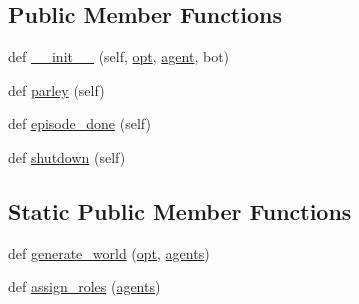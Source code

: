 \subsection*{Public Member Functions}
\begin{DoxyCompactItemize}
\item 
def \hyperlink{classparlai_1_1chat__service_1_1tasks_1_1chatbot_1_1worlds_1_1MessengerBotChatTaskWorld_a5e7d694f09fe64607a3e0c8b19e5e893}{\+\_\+\+\_\+init\+\_\+\+\_\+} (self, \hyperlink{classparlai_1_1core_1_1worlds_1_1World_a3640d92718acd3e6942a28c1ab3678bd}{opt}, \hyperlink{classparlai_1_1chat__service_1_1tasks_1_1chatbot_1_1worlds_1_1MessengerBotChatTaskWorld_aaf90973d4719a52bdf62d221d044399e}{agent}, bot)
\item 
def \hyperlink{classparlai_1_1chat__service_1_1tasks_1_1chatbot_1_1worlds_1_1MessengerBotChatTaskWorld_a3a6e3c07cd5d635cef46c04698d61618}{parley} (self)
\item 
def \hyperlink{classparlai_1_1chat__service_1_1tasks_1_1chatbot_1_1worlds_1_1MessengerBotChatTaskWorld_a0e32608f63e814c824a0aaf53e144ee8}{episode\+\_\+done} (self)
\item 
def \hyperlink{classparlai_1_1chat__service_1_1tasks_1_1chatbot_1_1worlds_1_1MessengerBotChatTaskWorld_a53f0006a0960cc68238badfc5eb44b06}{shutdown} (self)
\end{DoxyCompactItemize}
\subsection*{Static Public Member Functions}
\begin{DoxyCompactItemize}
\item 
def \hyperlink{classparlai_1_1chat__service_1_1tasks_1_1chatbot_1_1worlds_1_1MessengerBotChatTaskWorld_ad1e82a6e8fc6eb6048042396085215f9}{generate\+\_\+world} (\hyperlink{classparlai_1_1core_1_1worlds_1_1World_a3640d92718acd3e6942a28c1ab3678bd}{opt}, \hyperlink{classparlai_1_1core_1_1worlds_1_1World_a728f75194cc26ea4035047c46cf62608}{agents})
\item 
def \hyperlink{classparlai_1_1chat__service_1_1tasks_1_1chatbot_1_1worlds_1_1MessengerBotChatTaskWorld_af00ebaa48c6d1125d3e1bc421940aa2f}{assign\+\_\+roles} (\hyperlink{classparlai_1_1core_1_1worlds_1_1World_a728f75194cc26ea4035047c46cf62608}{agents})
\end{DoxyCompactItemize}
